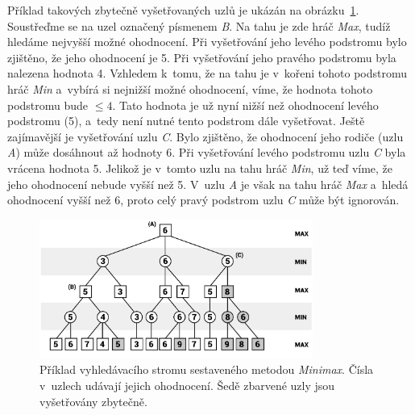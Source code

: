 Příklad takových zbytečně vyšetřovaných uzlů je ukázán na obrázku~\ref{fig:alpha-beta-pruning}. Soustřeďme se na uzel označený písmenem \emph{B}. Na tahu je zde hráč \emph{Max}, tudíž hledáme nejvyšší možné ohodnocení. Při vyšetřování jeho levého podstromu bylo zjištěno, že jeho ohodnocení je 5. Při vyšetřování jeho pravého podstromu byla nalezena hodnota 4. Vzhledem k~tomu, že na tahu je v~kořeni tohoto podstromu hráč \emph{Min} a~vybírá si nejnižší možné ohodnocení, víme, že hodnota tohoto podstromu bude $\leq 4$. Tato hodnota je už nyní nižší než ohodnocení levého podstromu (5), a~tedy není nutné tento podstrom dále vyšetřovat. Ještě zajímavější je vyšetřování uzlu \emph{C}. Bylo zjištěno, že ohodnocení jeho rodiče (uzlu \emph{A}) může dosáhnout až hodnoty 6. Při vyšetřování levého podstromu uzlu \emph{C} byla vrácena hodnota 5. Jelikož je v~tomto uzlu na tahu hráč \emph{Min}, už teď víme, že jeho ohodnocení nebude vyšší než 5. V~uzlu \emph{A} je však na tahu hráč \emph{Max} a~hledá ohodnocení vyšší než 6, proto celý pravý podstrom uzlu \emph{C} může být ignorován.

\begin{figure}[ht]
    \centering
    \includegraphics[width=0.8\textwidth]{doc/obrazky-figures/ab-pruning.pdf}
    \caption{Příklad vyhledávacího stromu \cite{ab_pruning} sestaveného metodou \emph{Minimax}. Čísla v~uzlech udávají jejich ohodnocení. Šedě zbarvené uzly jsou vyšetřovány zbytečně.}
    \label{fig:alpha-beta-pruning}
\end{figure}

